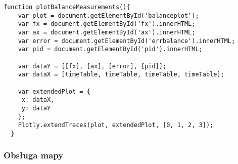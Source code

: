 \documentclass[a4paper,12pt,twoside,openany]{report}
\begin{document}
\begin{lstlisting}[style=customhtml]
  function plotBalanceMeasurements(){
    var plot = document.getElementById('balanceplot');
    var fx = document.getElementById('fx').innerHTML;
    var ax = document.getElementById('ax').innerHTML;
    var error = document.getElementById('errbalance').innerHTML;
    var pid = document.getElementById('pid').innerHTML;
	
    var dataY = [[fx], [ax], [error], [pid]];
    var dataX = [timeTable, timeTable, timeTable, timeTable];
	
    var extendedPlot = {
     x: dataX,
     y: dataY
    };
    Plotly.extendTraces(plot, extendedPlot, [0, 1, 2, 3]);
  }
\end{lstlisting}

\subsubsection{Obsługa mapy}
\end{document}
